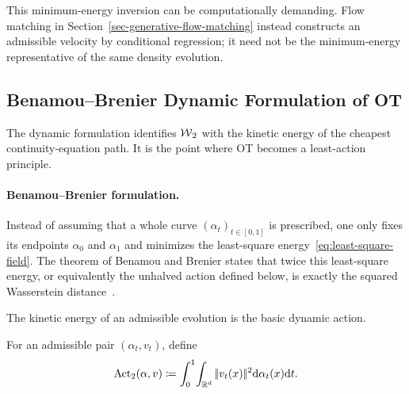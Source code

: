 This minimum-energy inversion can be computationally demanding. Flow matching in Section~\ref{sec-generative-flow-matching} instead constructs an admissible velocity by conditional regression; it need not be the minimum-energy representative of the same density evolution.

\subsection{Benamou--Brenier Dynamic Formulation of OT}
\label{sec-benamou-brenier-dynamic}

The dynamic formulation identifies $\operatorname{\mathcal{W}}_2$ with the kinetic energy of the cheapest continuity-equation path. It is the point where OT becomes a least-action principle.

\paragraph{Benamou--Brenier formulation.}

Instead of assuming that a whole curve $(\alpha_t)_{t\in[0,1]}$ is prescribed, one only fixes its endpoints $\alpha_0$ and $\alpha_1$ and minimizes the least-square energy~\eqref{eq:least-square-field}. The theorem of Benamou and Brenier states that twice this least-square energy, or equivalently the unhalved action defined below, is exactly the squared Wasserstein distance~\citep{benamou2000computational}.

The kinetic energy of an admissible evolution is the basic dynamic action.
\begin{defn}\label{def-benamou-brenier-action}
For an admissible pair $(\alpha_t,v_t)$, define
\[
\operatorname{Act}_2(\alpha,v)
\coloneqq
\int_0^1\!\int_{\mathbb{R}^d}|\!| v_t(x) |\!|^2\mathrm{d}\alpha_t(x)\mathrm{d} t.
\]
\end{defn}

